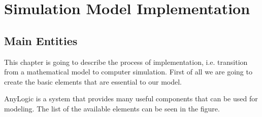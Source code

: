 \chapter{Simulation Model Implementation}


\section{Main Entities}

This chapter is going to describe the process of implementation, i.e. transition from a mathematical model to computer simulation. First of all we are going to create the basic elements that are essential to our model.



AnyLogic is a system that provides many useful components that can be used for modeling. The list of the available elements can be seen in the figure.

